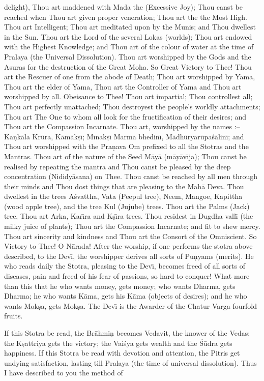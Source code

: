 delight), Thou art maddened with Mada the (Excessive Joy); Thou canst be reached when Thou art given proper veneration; Thou art the the Most High. Thou art Intelligent; Thou art meditated upon by the Munis; and Thou dwellest in the Sun. Thou art the Lord of the several Lokas (worlds); Thou art endowed with the Highest Knowledge; and Thou art of the colour of water at the time of Pralaya (the Universal Dissolution). Thou art worshipped by the Gods and the Asuras for the destruction of the Great Moha. So Great Victory to Thee! Thou art the Rescuer of one from the abode of Death; Thou art worshipped by Yama, Thou art the elder of Yama, Thou art the Controller of Yama and Thou art worshipped by all. Obeisance to Thee! Thou art impartial; Thou controllest all; Thou art perfectly unattached; Thou destroyest the people's worldly attachments; Thou art The One to whom all look for the fructification of their desires; and Thou art the Compassion Incarnate. Thou art, worshipped by the names :-- Ka\d{n}k\=ala Kr\=ura, K\=am\=ak\d{s}\={\i}; M\={\i}nak\d{s}\={\i} Marma bhedin\={\i}, M\=adh\=uryar\=upa\'s\=alin\={\i}; and Thou art worshipped with the Pra\d{n}ava Om prefixed to all the Stotras and the Mantras. Thou art of the nature of the Seed M\=ay\=a (m\=ay\=av\={\i}ja); Thou canst be realised by repeating the mantra and Thou canst be pleased by the deep concentration (Nididy\=asana) on Thee. Thou canst be reached by all men through their minds and Thou dost things that are pleasing to the Mah\=a Deva. Thou dwellest in the trees A\'svattha, Vata (Peepul tree), Neem, Mangoe, Kapittha (wood apple tree), and the tree Kul (Jujube) trees. Thou art the Palms (Jack) tree, Thou art Arka, Kar\={\i}ra and K\d{s}\={\i}ra trees. Thou residest in Dugdha vall\={\i} (the milky juice of plants); Thou art the Compassion Incarnate; and fit to shew mercy. Thou art sincerity and kindness and Thou art the Consort of the Omniscient. So Victory to Thee! O N\=arada! After the worship, if one performs the stotra above described, to the Dev\={\i}, the worshipper derives all sorts of Pu\d{n}yams (merits). He who reads daily the Stotra, pleasing to the Dev\={\i}, becomes freed of all sorts of diseases, pain and freed of his fear of passions, so hard to conquer! What more than this that he who wants money, gets money; who wants Dharma, gets Dharma; he who wants K\=ama, gets his K\=ama (objects of desires); and he who wants Mok\d{s}a, gets Mok\d{s}a. The Dev\={\i} is the Awarder of the Chatur Varga fourfold fruits.

If this Stotra be read, the Br\=ahmi\d{n} becomes Vedavit, the knower of the Vedas; the K\d{s}attriya gets the victory; the Vai\'sya gets wealth and the \'S\=udra gets happiness. If this Stotra be read with devotion and attention, the Pitris get undying satisfaction, lasting till Pralaya (the time of universal dissolution). Thus I have described to you the method of

